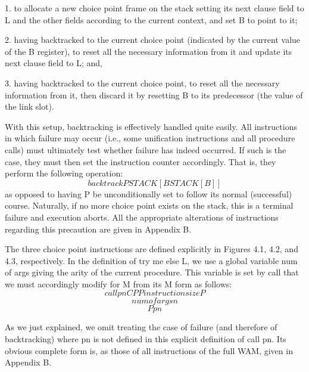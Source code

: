 1. to allocate a new choice point frame on the stack setting its next clause field
to L and the other fields according to the current context, and set B to point
to it;

2. having backtracked to the current choice point (indicated by the current
value of the B register), to reset all the necessary information from it and
update its next clause field to L; and,

3. having backtracked to the current choice point, to reset all the necessary
information from it, then discard it by resetting B to its predecessor (the
value of the link slot).

With this setup, backtracking is effectively handled quite easily. All instructions
in which failure may occur (i.e., some unification instructions and all procedure
calls) must ultimately test whether failure has indeed occurred. If such is the case,
they must then set the instruction counter accordingly. That is, they perform the
following operation:
\[backtrack  P  STACK[B  STACK[B]  ]\]
as opposed to having P be unconditionally set to follow its normal (successful)
course. Naturally, if no more choice point exists on the stack, this is a terminal
failure and execution aborts. All the appropriate alterations of instructions regarding
this precaution are given in Appendix B.

The three choice point instructions are defined explicitly in Figures 4.1, 4.2, and 4.3,
respectively. In the definition of try me else L, we use a global variable
num of args giving the arity of the current procedure. This variable is set by
call that we must accordingly modify for M from its M form as follows:
\[call pn  CP  P  instruction sizeP\]
\[num of args  n\]
\[P  pn\]

As we just explained, we omit treating the case of failure (and therefore of backtracking)
where pn is not defined in this explicit definition of call pn. Its
obvious complete form is, as those of all instructions of the full WAM, given in
Appendix B.

